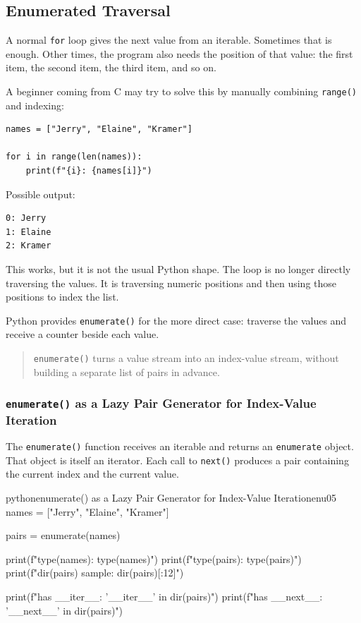 \subsection{Enumerated Traversal}

A normal \texttt{for} loop gives the next value from an iterable. Sometimes that is enough. Other times, the program also needs the position of that value: the first item, the second item, the third item, and so on.

A beginner coming from C may try to solve this by manually combining \texttt{range()} and indexing:

\begin{verbatim}
names = ["Jerry", "Elaine", "Kramer"]

for i in range(len(names)):
    print(f"{i}: {names[i]}")
\end{verbatim}

Possible output:

\begin{verbatim}
0: Jerry
1: Elaine
2: Kramer
\end{verbatim}

This works, but it is not the usual Python shape. The loop is no longer directly traversing the values. It is traversing numeric positions and then using those positions to index the list.

Python provides \texttt{enumerate()} for the more direct case: traverse the values and receive a counter beside each value.

\begin{quote}
\texttt{enumerate()} turns a value stream into an index-value stream, without building a separate list of pairs in advance.
\end{quote}

\subsubsection{\texttt{enumerate()} as a Lazy Pair Generator for Index-Value Iteration}

The \texttt{enumerate()} function receives an iterable and returns an \texttt{enumerate} object. That object is itself an iterator. Each call to \texttt{next()} produces a pair containing the current index and the current value.

\begin{codebox}[]{python}{enumerate() as a Lazy Pair Generator for Index-Value Iteration}{enu05}
names = ["Jerry", "Elaine", "Kramer"]

pairs = enumerate(names)

print(f"type(names): {type(names)}")
print(f"type(pairs): {type(pairs)}")
print(f"dir(pairs) sample: {dir(pairs)[:12]}")

print(f"has __iter__: {'__iter__' in dir(pairs)}")
print(f"has __next__: {'__next__' in dir(pairs)}")
\end{codebox}


